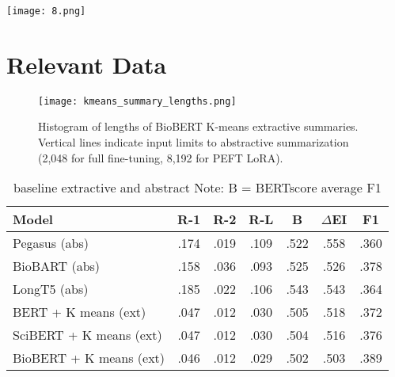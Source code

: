 \documentclass[11pt]{article}
\begin{document}
\begin{center}
  \texttt{[image: 8.png]}
  \label{fig:8}
\end{center}

\onecolumn

\section{Relevant Data}
\label{app:relevantdata}

\begin{figure}[h]
    \centering
    \texttt{[image: kmeans\_summary\_lengths.png]}
    \caption{Histogram of lengths of BioBERT K-means extractive summaries. Vertical lines indicate input limits to abstractive summarization (2,048 for full fine-tuning, 8,192 for PEFT LoRA).}
    \label{fig:kmeans_summary_lengths}
\end{figure}


\begin{table*}[h!]
  \centering
  \small
  \begin{tabular}{lcccccc}
    \toprule
    Model & R-1  & R-2 & R-L & B & $\Delta$EI & F1\\
    \midrule
    Pegasus (abs) & .174 & .019 & .109 & .522 & .558 & .360 \\
    BioBART (abs) & .158 & .036 & .093 & .525 & .526 & .378 \\
    LongT5 (abs) & .185 & .022 & .106 & .543 & .543 & .364 \\
    BERT + K means (ext) & .047 & .012 & .030 & .505 & .518 & .372 \\
    SciBERT + K means (ext) & .047 & .012 & .030 & .504 & .516 & .376 \\
    BioBERT + K means (ext) & .046 & .012 & .029 & .502 & .503 & .389 \\
    \bottomrule
  \end{tabular}
  \caption{baseline extractive and abstract Note: B = BERTscore average F1}
  \label{tab:baseline_model_evaluation}
\end{table*}
\end{document}
